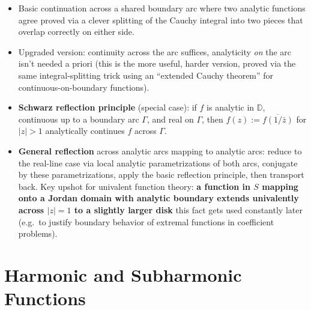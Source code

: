 \documentclass[
]{book}
\providecommand{\tightlist}{%
  \setlength{\itemsep}{0pt}\setlength{\parskip}{0pt}}
\theoremstyle{definition}
\theoremstyle{definition}
\theoremstyle{definition}
\theoremstyle{definition}
\theoremstyle{remark}
\begin{document}
\begin{itemize}
\tightlist
\item
  Basic continuation across a shared boundary arc where two analytic functions agree proved via a clever splitting of the Cauchy integral into two pieces that overlap correctly on either side.
\item
  Upgraded version: continuity across the arc suffices, analyticity \emph{on} the arc isn't needed a priori (this is the more useful, harder version, proved via the same integral-splitting trick using an ``extended Cauchy theorem'' for continuous-on-boundary functions).
\item
  \textbf{Schwarz reflection principle} (special case): if \(f\) is analytic in \(\mathbb{D}\), continuous up to a boundary arc \(\Gamma\), and real on \(\Gamma\), then \(f(z) := \overline{f(1/\bar z)}\) for \(|z|>1\) analytically continues \(f\) across \(\Gamma\).
\item
  \textbf{General reflection} across analytic arcs mapping to analytic arcs: reduce to the real-line case via local analytic parametrizations of both arcs, conjugate by these parametrizations, apply the basic reflection principle, then transport back. Key upshot for univalent function theory: \textbf{a function in \(S\) mapping onto a Jordan domain with analytic boundary extends univalently across \(|z|=1\) to a slightly larger disk} this fact gets used constantly later (e.g.~to justify boundary behavior of extremal functions in coefficient problems).
\end{itemize}

\section{Harmonic and Subharmonic Functions}\label{harmonic-and-subharmonic-functions}
\end{document}
